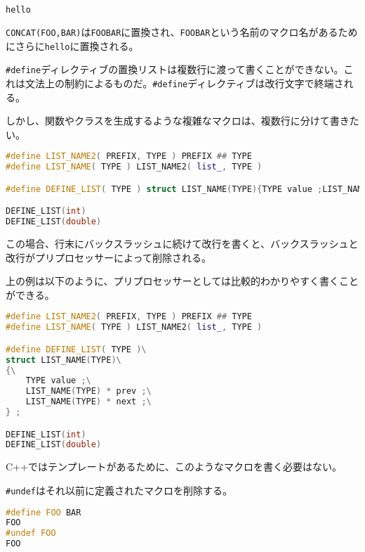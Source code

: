 \begin{lstlisting}[language={C++}]
hello
\end{lstlisting}

\texttt{CONCAT(FOO,BAR)}は\texttt{FOOBAR}に置換され、\texttt{FOOBAR}という名前のマクロ名があるためにさらに\texttt{hello}に置換される。


\texttt{\#define}ディレクティブの置換リストは複数行に渡って書くことができない。これは文法上の制約によるものだ。\texttt{\#define}ディレクティブは改行文字で終端される。

しかし、関数やクラスを生成するような複雑なマクロは、複数行に分けて書きたい。

\begin{lstlisting}[language={C++}]
#define LIST_NAME2( PREFIX, TYPE ) PREFIX ## TYPE
#define LIST_NAME( TYPE ) LIST_NAME2( list_, TYPE )

#define DEFINE_LIST( TYPE ) struct LIST_NAME(TYPE){TYPE value ;LIST_NAME(TYPE) * prev ;LIST_NAME(TYPE) * next ;} ; 

DEFINE_LIST(int)
DEFINE_LIST(double)
\end{lstlisting}

この場合、行末にバックスラッシュに続けて改行を書くと、バックスラッシュと改行がプリプロセッサーによって削除される。

上の例は以下のように、プリプロセッサーとしては比較的わかりやすく書くことができる。

\begin{lstlisting}[language={C++}]
#define LIST_NAME2( PREFIX, TYPE ) PREFIX ## TYPE
#define LIST_NAME( TYPE ) LIST_NAME2( list_, TYPE )

#define DEFINE_LIST( TYPE )\
struct LIST_NAME(TYPE)\
{\
    TYPE value ;\
    LIST_NAME(TYPE) * prev ;\
    LIST_NAME(TYPE) * next ;\
} ; 

DEFINE_LIST(int)
DEFINE_LIST(double)
\end{lstlisting}

C++ではテンプレートがあるために、このようなマクロを書く必要はない。


\texttt{\#undef}はそれ以前に定義されたマクロを削除する。

\begin{lstlisting}[language={C++}]
#define FOO BAR
FOO
#undef FOO
FOO
\end{lstlisting}

